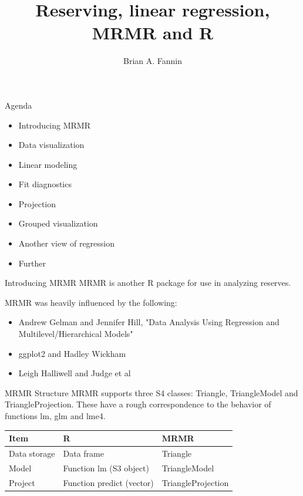 \documentclass[xcolor=dvipsnames]{beamer}\usepackage{graphicx, color}
\begin{document}
\title{Reserving, linear regression, MRMR and R}
\author{Brian A. Fannin}

\maketitle





\begin{frame} {Agenda}
  \begin{itemize}
    \item Introducing MRMR
    \item Data visualization 
    \item Linear modeling
    \item Fit diagnostics
    \item Projection
    \item Grouped visualization
    \item Another view of regression
    \item Further
  \end{itemize}
\end{frame}

\begin{frame} {Introducing MRMR}
  MRMR is another R package for use in analyzing reserves.
  
  MRMR was heavily influenced by the following:
  \begin{itemize}
    \item Andrew Gelman and Jennifer Hill, "Data Analysis Using Regression and Multilevel/Hierarchical Models"
    \item ggplot2 and Hadley Wickham
    \item Leigh Halliwell and Judge et al
  \end{itemize}
\end{frame}

\begin{frame} {MRMR Structure}
  MRMR supports three S4 classes: Triangle, TriangleModel and TriangleProjection. These have a rough correspondence to the behavior of functions lm, glm and lme4.
  
  \begin{tabular} { | l | l | l | }
    \hline
    Item & R & MRMR \\ \hline
    Data storage & Data frame & Triangle \\ \hline
    Model & Function lm (S3 object) & TriangleModel \\ \hline
    Project & Function predict (vector) & TriangleProjection \\ 
    \hline
  \end{tabular}
\end{frame}
\end{document}
